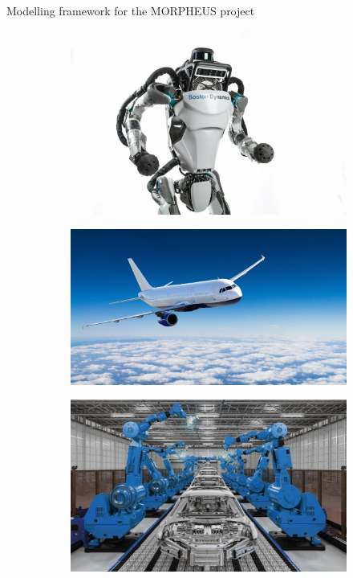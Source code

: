 \documentclass{beamer}
\begin{document}
\begin{frame}{Modelling framework for the MORPHEUS project}
	\begin{figure}[t]
		\begin{subfigure}[t]{0.3\textwidth}
			\includegraphics[width=\columnwidth]{robotics.jpg}\\
		\end{subfigure}\hfill
		\begin{subfigure}[t]{0.3\textwidth}
			\includegraphics[width=\columnwidth]{aerospace.jpg}\\
		\end{subfigure}\hfill
		\begin{subfigure}[t]{0.3\textwidth}
			\includegraphics[width=\columnwidth]{manufacturing.jpg}\\
		\end{subfigure}
	\end{figure}


\end{frame}
\end{document}
